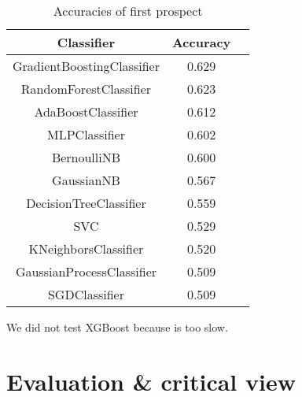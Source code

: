 \documentclass[12pt]{article}
\begin{document}
\begin{table}[!ht]
    \centering
    \begin{tabular}{ccc}
        \toprule
        \textbf{Classifier}        & \textbf{Accuracy} \\ \midrule
        GradientBoostingClassifier & 0.629             \\
        RandomForestClassifier     & 0.623             \\
        AdaBoostClassifier         & 0.612             \\
        MLPClassifier              & 0.602             \\
        BernoulliNB                & 0.600             \\
        GaussianNB                 & 0.567             \\
        DecisionTreeClassifier     & 0.559             \\
        SVC                        & 0.529             \\
        KNeighborsClassifier       & 0.520             \\
        GaussianProcessClassifier  & 0.509             \\
        SGDClassifier              & 0.509             \\ \bottomrule
    \end{tabular}
    \caption{Accuracies of first prospect}
\end{table}
We did not test XGBoost because is too slow.

\section{Evaluation \& critical view}
\end{document}
